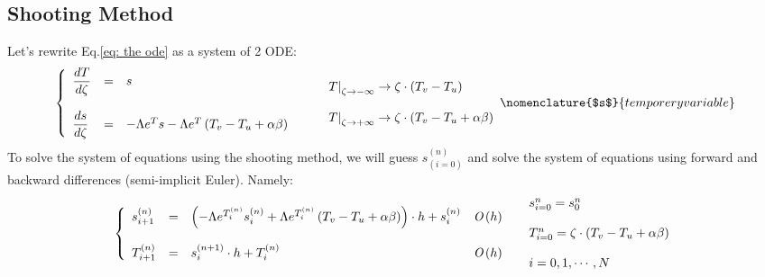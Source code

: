 \documentclass[11pt, a4paper]{article}
\begin{document}
\subsection{Shooting Method}
Let's rewrite Eq.\ref{eq: the ode} as a system of 2 ODE:
\begin{equation}
    \begin{matrix}
        \left\{\begin{array}{lcl}
            \displaystyle\frac{dT}{d\zeta} & = & s \\\\
            \displaystyle\frac{ds}{d\zeta} & = & -\Lambda e^Ts-\Lambda e^{T}\left(T_v-T_u+\alpha\beta\right)
        \end{array}\right. && \begin{array}{l}
            \left.T\right|_{\zeta\rightarrow-\infty}\rightarrow\zeta\cdot\left(T_v-T_u\right) \\\\
            \left.T\right|_{\zeta\rightarrow+\infty}\rightarrow\zeta\cdot\left(T_v-T_u+\alpha\beta\right)
        \end{array}
    \end{matrix}
    \nomenclature{$s$}{temporery variable}
\end{equation}
To solve the system of equations using the shooting method, we will guess $s_{(i=0)}^{(n)}$ and solve the system of equations using forward and backward differences (semi-implicit Euler). Namely:
\begin{equation}
    \begin{matrix}
        \left\{\begin{array}{lclr}
            \displaystyle s_{i+1}^{(n)} & = & \left(-\Lambda e^{T_i^{(n)}}s_i^{(n)}+\Lambda e^{T_i^{(n)}}\left(T_v-T_u+\alpha\beta\right)\right)\cdot h+s_i^{(n)} & \emph{O}\left(h\right)\\\\
            \displaystyle T_{i+1}^{(n)} & = & s_i^{(n+1)}\cdot h+T_i^{(n)} & \emph{O}\left(h\right)
        \end{array}\right. & \begin{array}{l}
            s_{i=0}^n=s_0^n \\\\
            T_{i=0}^n=\zeta\cdot\left(T_v-T_u+\alpha\beta\right) \\\\
            i=0,1,\cdots,N
        \end{array}
    \end{matrix}
\end{equation}
\end{document}
